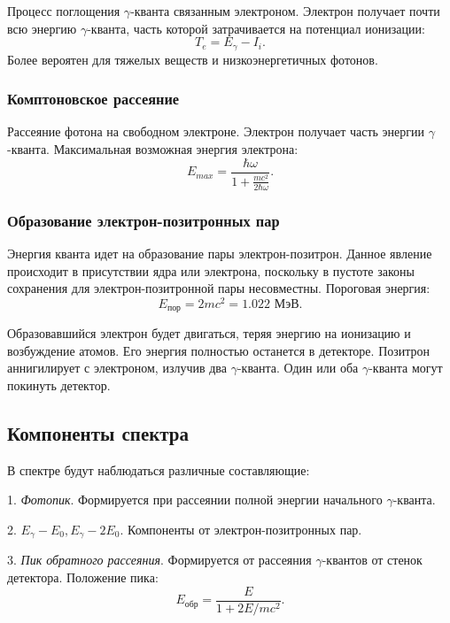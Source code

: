 \documentclass[12pt,a4paper]{article}
\begin{document}
	Процесс поглощения $\gamma$-кванта связанным электроном. Электрон получает почти всю энергию $\gamma$-кванта, часть которой затрачивается на потенциал ионизации:
	$$T_e = E_{\gamma} - I_i.$$
	Более вероятен для тяжелых веществ и низкоэнергетичных фотонов.
	
	\subsubsection*{Комптоновское рассеяние}
	
	Рассеяние фотона на свободном электроне. Электрон получает часть энергии $\gamma$-кванта. Максимальная возможная энергия электрона:
	\begin{equation}
		E_{max} = \frac{\hbar \omega}{1 + \frac{mc^2}{2\hbar \omega}}.
		\label{eq:compton}
	\end{equation}
	
	\subsubsection*{Образование электрон-позитронных пар}
	
	Энергия кванта идет на образование пары электрон-позитрон. Данное явление происходит в присутствии ядра или электрона, поскольку в пустоте законы сохранения для электрон-позитронной пары несовместны. Пороговая энергия:
	$$ E_{\text{пор}} = 2mc^2 = 1.022 \text{ МэВ}.$$
	
	Образовавшийся электрон будет двигаться, теряя энергию на ионизацию и возбуждение атомов. Его энергия полностью останется в детекторе. Позитрон аннигилирует с электроном, излучив два $\gamma$-кванта. Один или оба $\gamma$-кванта могут покинуть детектор.
	
	\subsection*{Компоненты спектра}
	
	В спектре будут наблюдаться различные составляющие:
	
	1. \textit{Фотопик}. Формируется при рассеянии полной энергии начального $\gamma$-кванта.
	
	2. $E_{\gamma} - E_0, E_{\gamma} - 2 E_0$. Компоненты от электрон-позитронных пар.
	
	3. \textit{Пик обратного рассеяния}. Формируется от рассеяния $\gamma$-квантов от стенок детектора. Положение пика:
	\begin{equation}
		E_{\text{обр}} =	\frac{E}{1 + 2E / mc^2}.
		\label{eq:backscattering}
	\end{equation}
	
\end{document}
